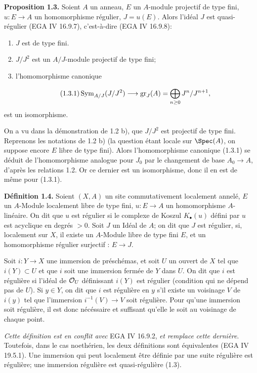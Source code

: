 \textbf{Proposition 1.3.} Soient $A$ un anneau, $E$ un $A$-module projectif de type fini, $u:E\longrightarrow A$ un homomorphisme régulier, $J=u(E)$. Alors l'idéal $J$ est quasi-régulier (EGA IV 16.9.7), c'est-à-dire (EGA IV 16.9.8):
\begin{enumerate}[label=\roman*)]
\item $J$ est de type fini.
\item $J/J^2$ est un $A/J$-module projectif de type fini;
\item l'homomorphisme canonique
\end{enumerate}
\begin{equation}\tag{1.3.1}
 \operatorname{Sym}_{A/J}(J/J^2)\longrightarrow \operatorname{gr}_J(A)=\bigoplus_{n\geq0}J^n/J^{n+1},
\end{equation}
est un isomorphisme.

On a vu dans la démonstration de 1.2 b), que $J/J^2$ est projectif de type fini. Reprenons les notations de 1.2 b) (la question étant locale sur $\Spec(A)$, on suppose encore $E$ libre de type fini). Alors l'homomorphisme canonique (1.3.1) se déduit de l'homomorphisme analogue pour $J_0$ par le changement de base $A_0\longrightarrow A$, d'après les relations 1.2. Or ce dernier est un isomorphisme, donc il en est de même pour (1.3.1).

\textbf{Définition 1.4.} Soient $(X,A)$ un site commutativement localement annelé, $E$ un $A$-Module localement libre de type fini, $u:E\longrightarrow A$ un homomorphisme $A$-linéaire. On dit que $u$ est régulier si le complexe de Koszul $K_\bullet(u)$ défini par $u$ est acyclique en degrés $>0$. Soit $J$ un Idéal de $A$; on dit que $J$ est
régulier, si, localement sur $X$, il existe un $A$-Module libre de type fini $E$, et un homomorphisme régulier surjectif : $E\longrightarrow J$.

Soit $i:Y\longrightarrow X$ une immersion de préschémas, et soit $U$ un ouvert de $X$ tel que $i(Y)\subset U$ et que $i$ soit une immersion fermée de $Y$ dans $U$. On dit que $i$ est régulière si l'idéal de $\mathcal O_U$ définissant $i(Y)$ est régulier (condition qui ne dépend pas de $U$). Si $y\in Y$, on dit que $i$ est régulière en $y$ s'il existe un voisinage $V$ de $i(y)$ tel que l'immersion $i^{-1}(V)\longrightarrow V$ soit régulière. Pour qu'une immersion soit régulière, il est donc nécéssaire et suffisant qu'elle le soit au voisinage de chaque point.

\emph{Cette définition est en conflit avec} EGA IV 16.9.2, \emph{et remplace cette dernière}. Toutefois, dans le cas noethérien, les deux définitions sont équivalentes (EGA IV 19.5.1). Une immersion qui peut localement être définie par une suite régulière est régulière; une immersion régulière est quasi-régulière (1.3).

